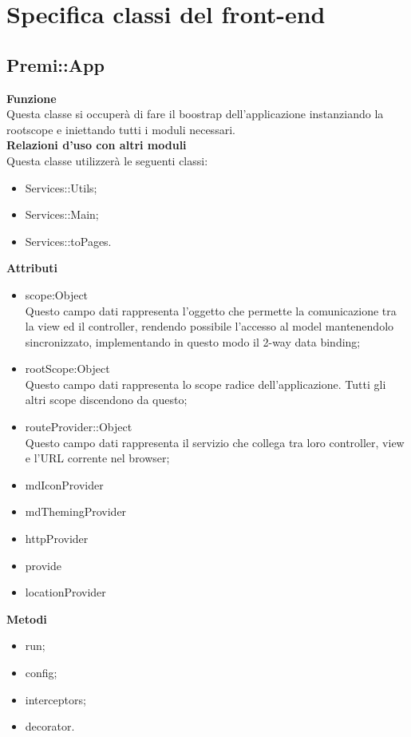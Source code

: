\section {Specifica classi del front-end}
\subsection{Premi::App}
	\label{sec:premiapp}
	\textbf{Funzione}\\
	\indent Questa classe si occuperà di fare il boostrap dell'applicazione instanziando la rootscope  e iniettando tutti i moduli necessari.\\
	\textbf{Relazioni d'uso con altri moduli}\\
	\indent Questa classe utilizzerà le seguenti classi:
	\begin{itemize}
		\item Services::Utils;
		\item Services::Main;
		\item Services::toPages.
	\end{itemize}
	\textbf{Attributi}\\
	\begin{itemize}
		\item scope:Object\\
		Questo campo dati rappresenta l’oggetto che permette la comunicazione tra la view ed il controller, rendendo possibile l’accesso al model mantenendolo sincronizzato, implementando in questo modo il 2-way data binding;
		\item rootScope:Object\\
		Questo campo dati rappresenta lo scope radice dell’applicazione. Tutti gli altri scope	discendono da questo;
		\item \textdollar routeProvider::Object\\
		Questo campo dati rappresenta il servizio che collega tra loro controller, view e l'URL corrente nel browser;
		\item \textdollar mdIconProvider\\
		\item \textdollar mdThemingProvider\\
		\item \textdollar httpProvider\\
		\item \textdollar provide\\
		\item \textdollar locationProvider\\
	\end{itemize}
	\textbf{Metodi}
	\begin{itemize}
		\item run;
		\item config;
		\item interceptors;
		\item decorator.
	\end{itemize}

